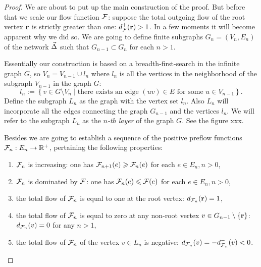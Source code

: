 \documentclass[12pt]{article}
\begin{document}
\begin{proof}
      We are about to put up the main construction of the proof.
      But before that we scale our flow function $\mathcal{F}$: suppose the total outgoing flow of the root vertex $\mathbf{r}$ is strictly greater than one:
        $d^{+}_{\mathcal{F}}(\mathbf{r}) > 1$.
      In a few moments it will become apparent why we did so.
      We are going to define finite subgraphs $G_n = (V_n, E_n)$ of the network $\vec{\Delta}$ such that $G_{n-1} \subset G_{n}$ for each $n > 1$.
      \begin{note}
        Essentially our construction is based on a breadth-first-search in the infinite graph $G$,
          so $V_n = V_{n-1} \cup l_n$ where $l_n$ is all the vertices in the neighborhood of the subgraph $V_{n-1}$
          in the graph $G$:
          \[
            l_n := \left\{v \in G \setminus V_n \mid \text{there exists an edge $(uv) \in E$ for some $u \in V_{n-1}$} \right\}.
          \]
        Define the subgraph $L_n$ as the graph with the vertex set $l_n$.
        Also $L_n$ will incorporate all the edges connecting the graph $G_{n-1}$ and the vertices $l_n$.
        We will refer to the subgraph $L_n$ as the \emph{$n$-th layer} of the graph $G$.
        See the figure xxx.
      \end{note}
      Besides we are going to establish a sequence of the positive preflow functions $\mathcal{F}_{n}: E_n \to \mathbb{R}^{+}$,
        pertaining the following properties:
        \begin{enumerate}[label=\textbf{P\arabic*}]
          \item \label{p1} $\mathcal{F}_{n}$ is increasing: 
            one has $\mathcal{F}_{n+1}(e) \geqslant \mathcal{F}_{n}(e)$ for each $e \in E_n, n > 0$,
          \item \label{p2} $\mathcal{F}_{n}$ is dominated by $\mathcal{F}$:
            one has $\mathcal{F}_{n}(e) \leqslant \mathcal{F}(e)$ for each $e \in E_n, n> 0$,
          \item \label{p3} the total flow of $\mathcal{F}_{n}$ is equal to one at the root vertex: $d_{\mathcal{F}_{n}}(\mathbf{r}) = 1$,
          \item \label{p4} the total flow of $\mathcal{F}_{n}$ is equal to zero at any non-root vertex
            $v \in G_{n-1}\setminus \left\{\mathbf{r}\right\}$: $d_{\mathcal{F}_{n}}(v) = 0$ for any $n > 1$,
          \item \label{p5} the total flow of $\mathcal{F}_{n}$ 
            of the vertex $v \in L_n$ is negative: $d_{\mathcal{F}_{n}}(v) = -d^{-}_{\mathcal{F}_{n}}(v) < 0$.
        \end{enumerate}

\end{proof}
\end{document}
